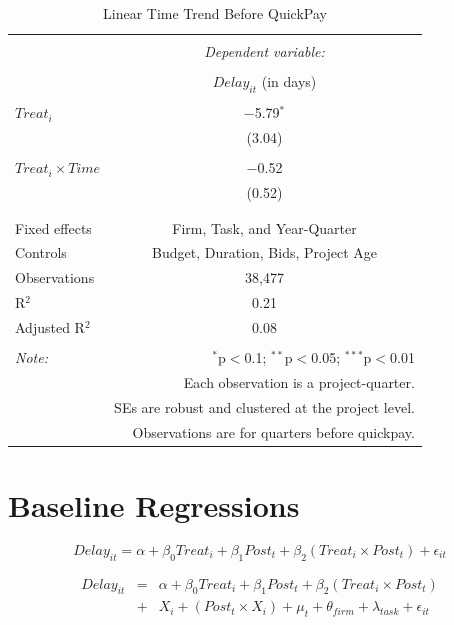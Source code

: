\documentclass[
]{article}
\begin{document}
\begin{table}[H] \centering 
  \caption{Linear Time Trend Before QuickPay} 
  \label{} 
\small 
\begin{tabular}{@{\extracolsep{5pt}}lc} 
\\[-1.8ex]\hline 
\hline \\[-1.8ex] 
 & \multicolumn{1}{c}{\textit{Dependent variable:}} \\ 
\cline{2-2} 
\\[-1.8ex] & $Delay_{it}$ (in days) \\ 
\hline \\[-1.8ex] 
 $Treat_i$ & $-$5.79$^{*}$ \\ 
  & (3.04) \\ 
  & \\ 
 $Treat_i \times Time$ & $-$0.52 \\ 
  & (0.52) \\ 
  & \\ 
\hline \\[-1.8ex] 
Fixed effects & Firm, Task, and Year-Quarter \\ 
Controls & Budget, Duration, Bids, Project Age \\ 
Observations & 38,477 \\ 
R$^{2}$ & 0.21 \\ 
Adjusted R$^{2}$ & 0.08 \\ 
\hline 
\hline \\[-1.8ex] 
\textit{Note:}  & \multicolumn{1}{r}{$^{*}$p$<$0.1; $^{**}$p$<$0.05; $^{***}$p$<$0.01} \\ 
 & \multicolumn{1}{r}{Each observation is a project-quarter.} \\ 
 & \multicolumn{1}{r}{SEs are robust and clustered at the project level.} \\ 
 & \multicolumn{1}{r}{Observations are for quarters before quickpay.} \\ 
\end{tabular} 
\end{table}

\hypertarget{baseline-regressions}{%
\section{Baseline Regressions}\label{baseline-regressions}}

\[ Delay_{it} = \alpha+\beta_0 Treat_i + \beta_1 Post_t + \beta_2 (Treat_i \times Post_t) + \epsilon_{it}\]

\[ \begin{aligned} Delay_{it} &=& \alpha+\beta_0 Treat_i + \beta_1 Post_t + \beta_2 (Treat_i \times Post_t)\\
&+&  X_i + (Post_t \times X_i) + \mu_t + \theta_{firm} + \lambda_{task}+ \epsilon_{it}
\end{aligned}\]
\end{document}

